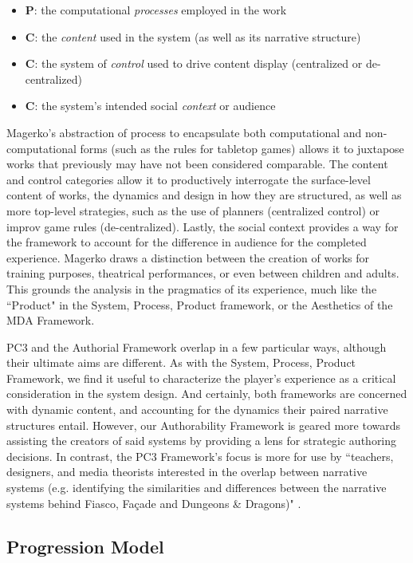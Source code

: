 \begin{itemize}
    \item \textbf{P}: the computational \textit{processes} employed in the work
    \item \textbf{C}: the \textit{content} used in the system (as well as its narrative structure)
    \item \textbf{C}: the system of \textit{control} used to drive content display (centralized or de-centralized)
    \item \textbf{C}: the system's intended social \textit{context} or audience
\end{itemize}

Magerko's abstraction of process to encapsulate both computational and non-computational forms (such as the rules for tabletop games) allows it to juxtapose works that previously may have not been considered comparable. The content and control categories allow it to productively interrogate the surface-level content of works, the dynamics and design in how they are structured, as well as more top-level strategies, such as the use of planners (centralized control) or improv game rules (de-centralized). Lastly, the social context provides a way for the framework to account for the difference in audience for the completed experience. Magerko draws a distinction between the creation of works for training purposes, theatrical performances, or even between children and adults. This grounds the analysis in the pragmatics of its experience, much like the ``Product" in the System, Process, Product framework, or the Aesthetics of the MDA Framework.

PC3 and the Authorial Framework overlap in a few particular ways, although their ultimate aims are different. As with the System, Process, Product Framework, we find it useful to characterize the player's experience as a critical consideration in the system design. And certainly, both frameworks are concerned with dynamic content, and accounting for the dynamics their paired narrative structures entail. However, our Authorability Framework is geared more towards assisting the creators of said systems by providing a lens for strategic authoring decisions. In contrast, the PC3 Framework's focus is more for use by ``teachers, designers, and media theorists interested in the overlap between narrative systems (e.g. identifying the similarities and differences between the narrative systems behind Fiasco, Fa{\c c}ade and Dungeons \& Dragons)" \cite{magerko_PC3}.

\subsection{Progression Model}


